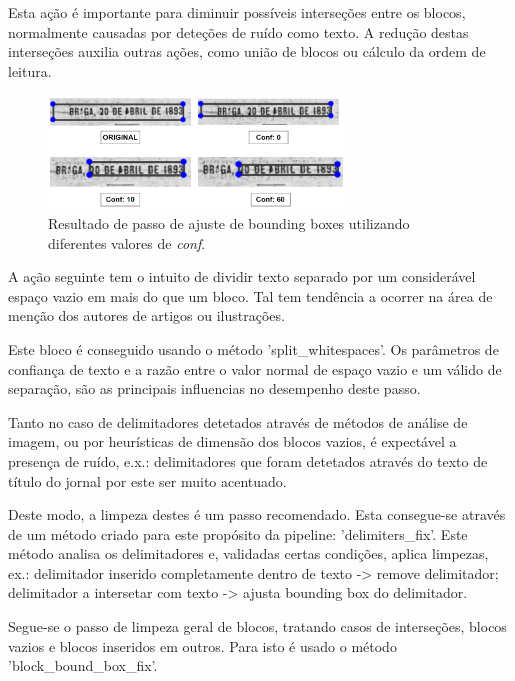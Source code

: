 Esta ação é importante para diminuir possíveis interseções entre os blocos, normalmente causadas por deteções de ruído como texto. A redução destas interseções auxilia outras ações, como união de blocos ou cálculo da ordem de leitura.


\begin{figure}[H]
	\centering
	\includegraphics[width=0.7\textwidth]{images/ilustracoes/adjust_bounding_boxes_example.png}
	\caption{Resultado de passo de ajuste de bounding boxes utilizando diferentes valores de \textit{conf}.}
	\label{fig:adjust_bounding_boxes_example}
\end{figure}



A ação seguinte tem o intuito de dividir texto separado por um considerável espaço vazio em mais do que um bloco. Tal tem tendência a ocorrer na área de menção dos autores de artigos ou ilustrações.

Este bloco é conseguido usando o método 'split\_whitespaces'. Os parâmetros de confiança de texto e a razão entre o valor normal de espaço vazio e um válido de separação, são as principais influencias no desempenho deste passo.




Tanto no caso de delimitadores detetados através de métodos de análise de imagem, ou por heurísticas de dimensão dos blocos vazios, é expectável a presença de ruído, e.x.: delimitadores que foram detetados através do texto de título do jornal por este ser muito acentuado.

Deste modo, a limpeza destes é um passo recomendado. Esta consegue-se através de um método criado para este propósito da pipeline: 'delimiters\_fix'. Este método analisa os delimitadores e, validadas certas condições, aplica limpezas, ex.: delimitador inserido completamente dentro de texto -> remove delimitador; delimitador a intersetar com texto -> ajusta bounding box do delimitador.



Segue-se o passo de limpeza geral de blocos, tratando casos de interseções, blocos vazios e blocos inseridos em outros. Para isto é usado o método 'block\_bound\_box\_fix'.


